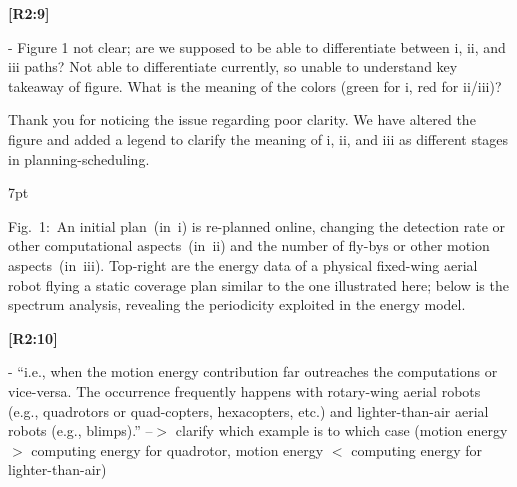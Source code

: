 \documentclass[10pt]{letter}
\newenvironment{formal}{%
  \def\FrameCommand{%
    \hspace{1pt}%
    {\color{red}\vrule width 2pt}%
    {\color{formalshade}\vrule width 4pt}%
    \colorbox{formalshade}%
  }%
  \MakeFramed{\advance\hsize-\width\FrameRestore}%
  \noindent\hspace{-4.55pt}%
  \begin{adjustwidth}{}{7pt}%
  \vspace{2pt}\vspace{2pt}%
}
{%
  \vspace{2pt}\end{adjustwidth}\endMakeFramed%
}
\begin{document}
{\hspace*{-4.5em}\textbf{[R2:9]}\vspace*{-1.9em}}

- Figure 1 not clear; are we supposed to be able to differentiate between i, ii, and iii paths? Not able to differentiate currently, so unable to understand key takeaway of figure. What is the meaning of the colors (green for i, red for ii/iii)?
  
{\color{blue} 

{\hspace*{-4.5em}{[R2:9]}\vspace*{-1.9em}}

Thank you for noticing the issue regarding poor clarity. We have altered the figure and added a legend to clarify the meaning of i, ii, and iii as different stages in planning-scheduling.

\begin{formal}
\color{black}
  {\color{blue}\scriptsize }
  {\color{black}\footnotesize%
  Fig.~1:~An initial plan~(in~{\color{red}i}) {\color{blue}is} re-planned online, changing the %
  detection rate or other computational aspects~(in~{\color{red}ii}) and %
  the number of fly-bys or other motion aspects~(in~{\color{red}iii}). 
  {\color{blue}Top-right} %
  {\color{blue}are} the energy data of a physical fixed-wing aerial robot flying a static coverage plan similar to the one illustrated here{\color{blue}; below is }%
  the spectrum analysis, %
  revealing the periodicity %
  exploited in the %
  energy model.
  }
  \vspace*{1ex}
\end{formal}

}

{\hspace*{-4.5em}\textbf{[R2:10]}\vspace*{-1.9em}}

- ``i.e., when the motion energy contribution far outreaches the computations or vice-versa. The occurrence frequently happens with rotary-wing aerial robots (e.g., quadrotors or quad-copters, hexacopters, etc.) and lighter-than-air aerial robots (e.g., blimps).'' --$>$ clarify which example is to which case (motion energy $>$ computing energy for quadrotor, motion energy $<$ computing energy for lighter-than-air)
  
\end{document}
